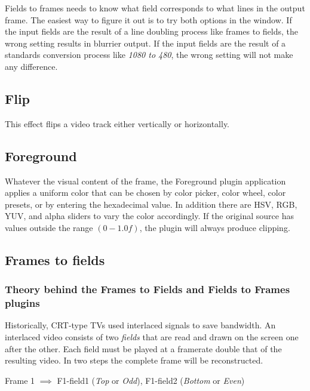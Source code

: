 Fields to frames needs to know what field corresponds to what lines in the output frame. The easiest way to figure it out is to try both options in the window. If the input fields are the result of a line doubling process like frames to fields, the wrong setting results in blurrier output. If the input fields are the result of a standards conversion process like \textit{1080 to 480}, the wrong setting will not make any difference.

\subsection{Flip}%
\label{sub:flip}

This effect flips a video track either vertically or horizontally.

\subsection{Foreground}%
\label{sub:foreground}

Whatever the visual content of the frame, the Foreground plugin application applies a uniform color that can be chosen by color picker, color wheel, color presets, or by entering the hexadecimal value. In addition there are HSV, RGB, YUV, and alpha sliders to vary the color accordingly. If the original source has values outside the range $(0 -1.0f)$, the plugin will always produce clipping.

\subsection{Frames to fields}%
\label{sub:frames_to_fields}

\subsubsection*{Theory behind the Frames to Fields and Fields to Frames plugins}
\label{ssub:theory_frames_fields}

Historically, CRT-type TVs used interlaced signals to save bandwidth. An interlaced video consists of two \textit{fields} that are read and drawn on the screen one after the other. Each field must be played at a framerate double that of the resulting video. In two steps the complete frame will be reconstructed.

Frame 1 $\implies$ F1-field1 (\textit{Top} or \textit{Odd}), F1-field2 (\textit{Bottom} or \textit{Even})

